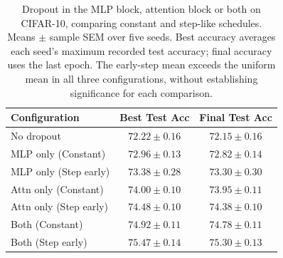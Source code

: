 \begin{table}[H]
 \caption{Dropout in the MLP block, attention block or both on CIFAR-10, comparing constant and step-like schedules. Means $\pm$ sample SEM over five seeds. Best accuracy averages each seed's maximum recorded test accuracy; final accuracy uses the last epoch. The early-step mean exceeds the uniform mean in all three configurations, without establishing significance for each comparison.}
 \label{tab:ablation_results}
 \centering
 \begin{tabular}{l c c}
 \toprule
 \textbf{Configuration} & \textbf{Best Test Acc} & \textbf{Final Test Acc} \\
 \midrule
 No dropout & $72.22 \pm 0.16$ & $72.15 \pm 0.16$ \\
 \midrule
 MLP only (Constant) & $72.96 \pm 0.13$ & $72.82 \pm 0.14$ \\
 MLP only (Step early) & $73.38 \pm 0.28$ & $73.30 \pm 0.30$ \\
 \midrule
 Attn only (Constant) & $74.00 \pm 0.10$ & $73.95 \pm 0.11$ \\
 Attn only (Step early) & $74.48 \pm 0.10$ & $74.38 \pm 0.10$ \\
 \midrule
 Both (Constant) & $74.92 \pm 0.11$ & $74.78 \pm 0.11$ \\
 Both (Step early) & $75.47 \pm 0.14$ & $75.30 \pm 0.13$ \\
 \bottomrule
 \end{tabular}
\end{table}

\FloatBarrier

